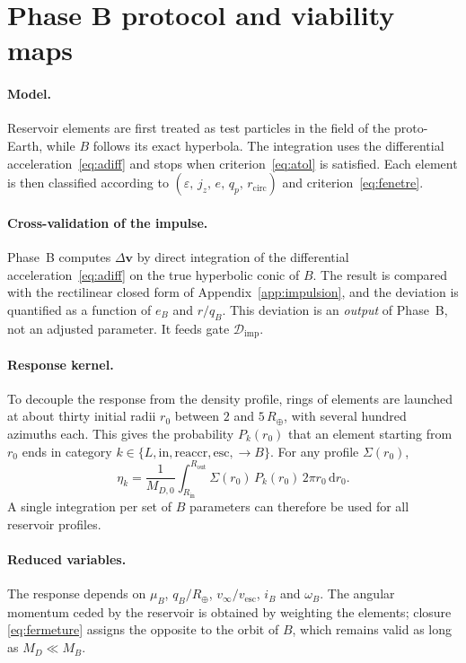 \documentclass[11pt,a4paper,openany]{report}
\newcommand{\Rt}{R_{\oplus}}
\newcommand{\dd}{\mathrm{d}}
\begin{document}
\section{Phase B protocol and viability maps}

\paragraph{Model.}
Reservoir elements are first treated as test particles in the field of the proto-Earth, while $B$
follows its exact hyperbola. The integration uses the differential acceleration~\eqref{eq:adiff}
and stops when criterion~\eqref{eq:atol} is satisfied. Each element is then classified according to
$(\varepsilon,\,j_z,\,e,\,q_p,\,r_{\mathrm{circ}})$ and criterion~\eqref{eq:fenetre}.

\paragraph{Cross-validation of the impulse.}
Phase~B computes $\Delta\mathbf{v}$ by direct integration of the differential
acceleration~\eqref{eq:adiff} on the true hyperbolic conic of $B$. The result is compared with the
rectilinear closed form of Appendix~\ref{app:impulsion}, and the deviation is quantified as a
function of $e_B$ and $r/q_B$. This deviation is an \emph{output} of Phase~B, not an adjusted
parameter. It feeds gate $\mathcal{D}_{\mathrm{imp}}$.

\paragraph{Response kernel.}
To decouple the response from the density profile, rings of elements are launched at about thirty
initial radii $r_0$ between $2$ and $5\,\Rt$, with several hundred azimuths each. This gives the
probability $P_k(r_0)$ that an element starting from $r_0$ ends in category
$k\in\{L,\mathrm{in},\mathrm{reaccr},\mathrm{esc},\to B\}$. For any profile $\Sigma(r_0)$,
\begin{equation}
\eta_k=\frac{1}{M_{D,0}}\int_{R_{\mathrm{in}}}^{R_{\mathrm{out}}}\Sigma(r_0)\,P_k(r_0)\,2\pi r_0\,\dd r_0.
\label{eq:noyau}
\end{equation}
A single integration per set of $B$ parameters can therefore be used for all reservoir profiles.

\paragraph{Reduced variables.}
The response depends on $\mu_B$, $q_B/\Rt$, $v_\infty/v_{\mathrm{esc}}$, $i_B$ and $\omega_B$. The
angular momentum ceded by the reservoir is obtained by weighting the elements; closure
\eqref{eq:fermeture} assigns the opposite to the orbit of $B$, which remains valid as long as
$M_D\ll M_B$.
\end{document}
